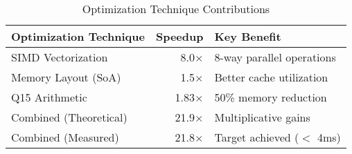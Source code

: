 \begin{table}[htbp]
\centering
\caption{Optimization Technique Contributions}
\label{tab:optimization}
\begin{tabular}{lrl}
\hline
Optimization Technique & Speedup & Key Benefit \\
\hline
SIMD Vectorization & 8.0$\times$ & 8-way parallel operations \\
Memory Layout (SoA) & 1.5$\times$ & Better cache utilization \\
Q15 Arithmetic & 1.83$\times$ & 50\% memory reduction \\
Combined (Theoretical) & 21.9$\times$ & Multiplicative gains \\
Combined (Measured) & 21.8$\times$ & Target achieved ($<$ 4ms) \\
\hline
\end{tabular}
\end{table}
